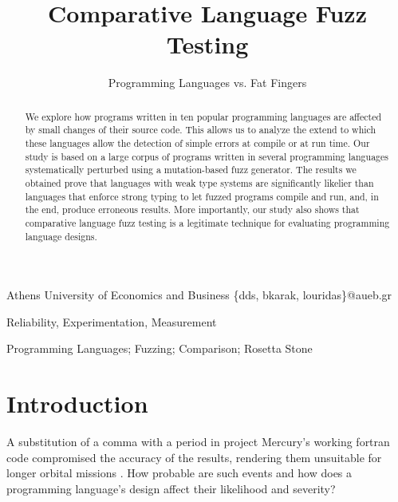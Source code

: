 \documentclass[10pt]{sigplanconf}
\begin{document}
\copyrightdata{[to be supplied]}


\title{Comparative Language Fuzz Testing}
\subtitle{Programming Languages vs. Fat Fingers}

  {Athens University of Economics and Business}
  {\{dds, bkarak, louridas\}@aueb.gr}

\maketitle

\begin{abstract}
We explore how programs written in ten popular programming languages
are affected by small changes of their source code.
This allows us to analyze the extend to which these languages
allow the detection of simple errors at compile or at run time.
Our study is based on a large corpus of programs written in several programming
languages systematically perturbed using a mutation-based fuzz generator.
The results we obtained
prove that languages with weak type systems are significantly
likelier than languages that enforce strong typing to let fuzzed programs
compile and run, and, in the end, produce erroneous results.
More importantly, our study also shows that comparative language fuzz testing
is a legitimate technique for evaluating programming language designs.
\end{abstract}


\terms
Reliability, Experimentation, Measurement

\keywords
Programming Languages; Fuzzing; Comparison; Rosetta Stone

\section{Introduction} %
\label{sec:intro}
A substitution of a comma with a period in project Mercury's working
{\sc fortran} code compromised the accuracy of the results,
rendering them unsuitable for longer orbital missions \cite{Brad89,Neu95}.
How probable are such events and how does a programming language's
design affect their likelihood and severity?
\end{document}
